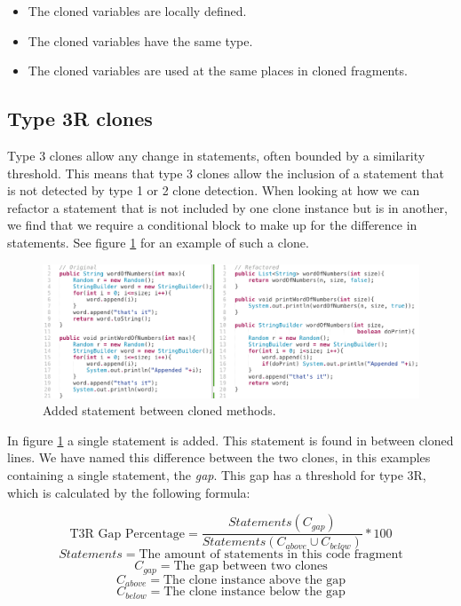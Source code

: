 \begin{itemize}
  \item The cloned variables are locally defined.
  \item The cloned variables have the same type.
  \item The cloned variables are used at the same places in cloned fragments.
\end{itemize}


\subsection{Type 3R clones}\label{sec:type3r}
Type 3 clones allow any change in statements, often bounded by a similarity threshold. This means that type 3 clones allow the inclusion of a statement that is not detected by type 1 or 2 clone detection. When looking at how we can refactor a statement that is not included by one clone instance but is in another, we find that we require a conditional block to make up for the difference in statements. See figure \ref{fig:type3} for an example of such a clone.

\begin{figure}[H]
  \centering
  \includegraphics[width=1\columnwidth]{img/type3_3}
  \caption{Added statement between cloned methods.}
  \label{fig:type3}
\end{figure}

In figure \ref{fig:type3} a single statement is added. This statement is found in between cloned lines. We have named this difference between the two clones, in this examples containing a single statement, the \textit{gap}. This gap has a threshold for type 3R, which is calculated by the following formula:

\begin{eqfloat}\label{eq:type3r}
$$\text{T3R Gap Percentage}=\frac{Statements(C_{gap})}{Statements(C_{above} \cup C_{below})}*100$$
$$Statements = \text{The amount of statements in this code fragment}$$
$$C_{gap} = \text{The gap between two clones}$$
$$C_{above} = \text{The clone instance above the gap}$$
$$C_{below} = \text{The clone instance below the gap}$$
\caption{Type 3R clone merge opportunities threshold formula}\end{eqfloat}

